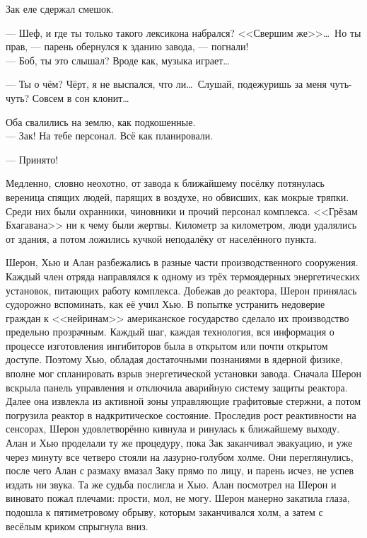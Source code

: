 \documentclass[openany, oneside]{book}
\begin{document}
Зак еле сдержал смешок.

--- Шеф, и где ты только такого лексикона набрался? <<Свершим же>>\dots \ Но ты прав, --- парень обернулся к зданию завода, --- погнали!\\

--- Боб, ты это слышал? Вроде как, музыка играет\dots

--- Ты о чём? Чёрт, я не выспался, что ли\dots \ Слушай, подежуришь за меня чуть-чуть? Совсем в сон клонит\dots

Оба свалились на землю, как подкошенные.\\

--- Зак! На тебе персонал. Всё как планировали.

--- Принято!

Медленно, словно неохотно, от завода к ближайшему посёлку потянулась вереница спящих людей, парящих в воздухе, но обвисших, как мокрые тряпки. Среди них были охранники, чиновники и прочий персонал комплекса. <<Грёзам Бхагавана>> ни к чему были жертвы. Километр за километром, люди удалялись от здания, а потом ложились кучкой неподалёку от населённого пункта.

Шерон, Хью и Алан разбежались в разные части производственного сооружения. Каждый член отряда направлялся к одному из трёх термоядерных энергетических установок, питающих работу комплекса. Добежав до реактора, Шерон принялась судорожно вспоминать, как её учил Хью. В попытке устранить недоверие граждан к <<нейринам>> американское государство сделало их производство предельно прозрачным. Каждый шаг, каждая технология, вся информация о процессе изготовления ингибиторов была в открытом или почти открытом доступе. Поэтому Хью, обладая достаточными познаниями в ядерной физике, вполне мог спланировать взрыв энергетической установки завода. Сначала Шерон вскрыла панель управления и отключила аварийную систему защиты реактора. Далее она извлекла из активной зоны управляющие графитовые стержни, а потом погрузила реактор в надкритическое состояние. Проследив рост реактивности на сенсорах, Шерон удовлетворённо кивнула и ринулась к ближайшему выходу. Алан и Хью проделали ту же процедуру, пока Зак заканчивал эвакуацию, и уже через минуту все четверо стояли на лазурно-голубом холме. Они переглянулись, после чего Алан с размаху вмазал Заку прямо по лицу, и парень исчез, не успев издать ни звука. Та же судьба послигла и Хью. Алан посмотрел на Шерон и виновато пожал плечами: прости, мол, не могу. Шерон манерно закатила глаза, подошла к пятиметровому обрыву, которым заканчивался холм, а затем с весёлым криком спрыгнула вниз.
\end{document}
